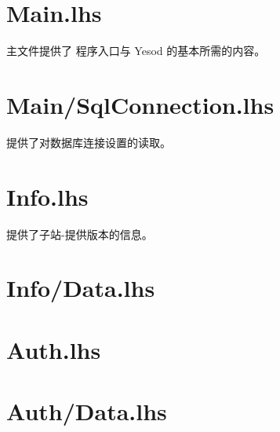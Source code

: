 










  \maketitle
  \newpage
  \tableofcontents
  \newpage

  \section[程序主文件 Main.lhs文件]{Main.lhs}
  主文件提供了 程序入口与 Yesod 的基本所需的内容。
  

  \section[设置载入文件 Main/SqlConnection.lhs文件]{Main/SqlConnection.lhs}
  提供了对数据库连接设置的读取。
  

  \section[子站-提供版本信息 Info.lhs文件]{Info.lhs}
  提供了子站-提供版本的信息。
  

  \section[辅助Info.lhs文件]{Info/Data.lhs}
  
  
  \section[认证]{Auth.lhs}
  
  
  \section[辅助Auth.lhs]{Auth/Data.lhs}
  
  


